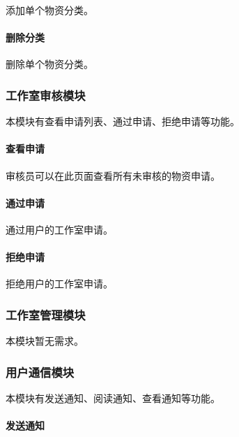 \documentclass[a4paper,fancyhdr,fntef,hyperref]{ctexart}
\begin{document}
添加单个物资分类。

\paragraph{删除分类}\label{ux5220ux9664ux5206ux7c7b}

删除单个物资分类。

\subsubsection{工作室审核模块}\label{ux5de5ux4f5cux5ba4ux5ba1ux6838ux6a21ux5757}

本模块有查看申请列表、通过申请、拒绝申请等功能。

\paragraph{查看申请}\label{ux67e5ux770bux7533ux8bf7}

审核员可以在此页面查看所有未审核的物资申请。

\paragraph{通过申请}\label{ux901aux8fc7ux7533ux8bf7-1}

通过用户的工作室申请。

\paragraph{拒绝申请}\label{ux62d2ux7eddux7533ux8bf7-1}

拒绝用户的工作室申请。

\subsubsection{工作室管理模块}\label{ux5de5ux4f5cux5ba4ux7ba1ux7406ux6a21ux5757}

本模块暂无需求。

\subsubsection{用户通信模块}\label{ux7528ux6237ux901aux4fe1ux6a21ux5757}

本模块有发送通知、阅读通知、查看通知等功能。

\paragraph{发送通知}\label{ux53d1ux9001ux901aux77e5}
\end{document}
